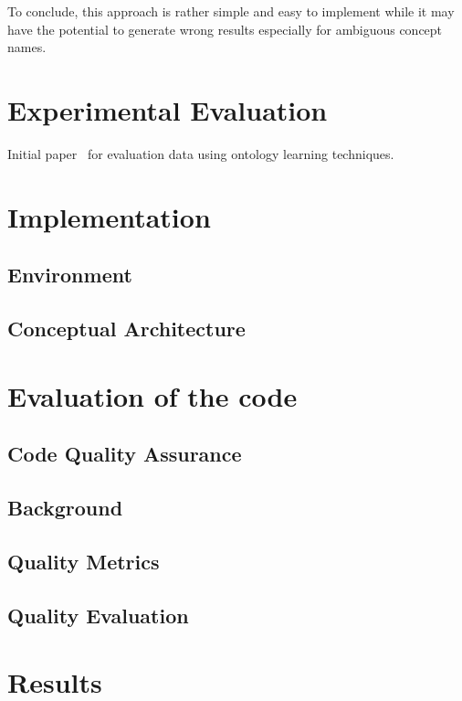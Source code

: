 \documentclass[draft,final]{vutinfth} %
\begin{document}
To conclude, this approach is rather simple and easy to implement while it may have the potential to generate wrong results especially for ambiguous concept names. 



\chapter{Experimental Evaluation}
Initial paper~\cite{liu2005semi} for evaluation data using ontology learning techniques.


\chapter{Implementation}\label{chap:implementation}
\section{Environment}
\section{Conceptual Architecture}




\chapter{Evaluation of the code}
\section{Code Quality Assurance}
\section{Background}
\section{Quality Metrics}
\section{Quality Evaluation}



\chapter{Results}
\end{document}
